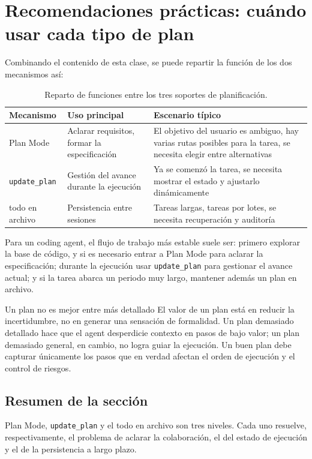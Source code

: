 \section{Recomendaciones prácticas: cuándo usar cada tipo de plan}

Combinando el contenido de esta clase, se puede repartir la función de los dos mecanismos así:

\begin{table}[H]
\centering
\begin{tabular}{lll}
\toprule
Mecanismo & Uso principal & Escenario típico \\
\midrule
Plan Mode & Aclarar requisitos, formar la especificación & El objetivo del usuario es ambiguo, hay varias rutas posibles para la tarea, se necesita elegir entre alternativas \\
\texttt{update\_plan} & Gestión del avance durante la ejecución & Ya se comenzó la tarea, se necesita mostrar el estado y ajustarlo dinámicamente \\
todo en archivo & Persistencia entre sesiones & Tareas largas, tareas por lotes, se necesita recuperación y auditoría \\
\bottomrule
\end{tabular}
\caption{Reparto de funciones entre los tres soportes de planificación.}
\end{table}

Para un coding agent, el flujo de trabajo más estable suele ser: primero explorar la base de código, y si es necesario entrar a Plan Mode para aclarar la especificación; durante la ejecución usar \texttt{update\_plan} para gestionar el avance actual; y si la tarea abarca un periodo muy largo, mantener además un plan en archivo.

\begin{warningbox}{Un plan no es mejor entre más detallado}
El valor de un plan está en reducir la incertidumbre, no en generar una sensación de formalidad. Un plan demasiado detallado hace que el agent desperdicie contexto en pasos de bajo valor; un plan demasiado general, en cambio, no logra guiar la ejecución. Un buen plan debe capturar únicamente los pasos que en verdad afectan el orden de ejecución y el control de riesgos.
\end{warningbox}

\subsection{Resumen de la sección}

Plan Mode, \texttt{update\_plan} y el todo en archivo son tres niveles. Cada uno resuelve, respectivamente, el problema de aclarar la colaboración, el del estado de ejecución y el de la persistencia a largo plazo.

